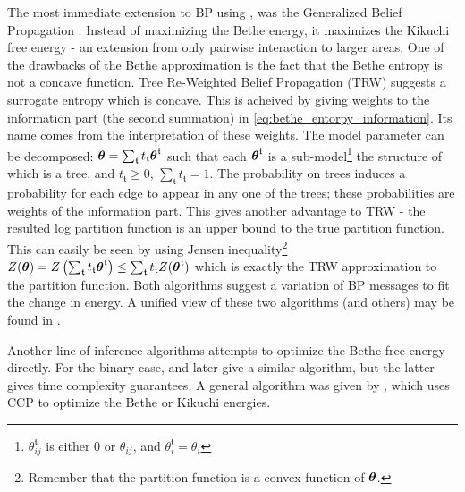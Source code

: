 The most immediate extension to BP using , was the Generalized Belief Propagation \cite{yedidia2000generalized}. 
Instead of maximizing the Bethe energy, it maximizes the Kikuchi free energy - an extension from only pairwise interaction to larger areas.
One of the drawbacks of the Bethe approximation is the fact that the Bethe entropy is not a concave function.
Tree Re-Weighted Belief Propagation (TRW) \cite{wainwright2003tree} suggests a surrogate entropy which is concave.
This is acheived by giving weights to the information part (the second summation) in \eqref{eq:bethe_entorpy_information}.
Its name comes from the interpretation of these weights.
The model parameter can be decomposed: $\boldsymbol{\theta}=\sum_{\mathfrak{t}} t_{\mathfrak{t}}\boldsymbol{\theta}^{\mathfrak{t}}$ such that each $\boldsymbol{\theta}^{\mathfrak{t}}$ is a sub-model\footnote{$\theta^{\mathfrak{t}}_{ij}$ is either $0$ or $\theta_{ij}$, and $\theta^{\mathfrak{t}}_i =\theta_i$} the structure of which is a tree, and $t_{\mathfrak{t}}\geq 0$, $\sum_{\mathfrak{t}} t_{\mathfrak{t}} = 1$.
The probability on trees induces a probability for each edge to appear in any one of the trees;
these probabilities are weights of the information part.
This gives another advantage to TRW - the resulted log partition function is an upper bound to the true partition function. 
This can easily be seen by using Jensen inequality\footnote{Remember that the partition function is a convex function of $\boldsymbol{\theta}$.} $Z(\boldsymbol{\theta}) = Z\left(\sum_{\mathfrak{t}} t_{\mathfrak{t}}\boldsymbol{\theta}^{\mathfrak{t}}\right) \leq \sum_{\mathfrak{t}} t_{\mathfrak{t}} Z(\boldsymbol{\theta}^{\mathfrak{t}})$ which is exactly the TRW approximation to the partition function.
Both algorithms suggest a variation of BP messages to fit the change in energy.
A unified view of these two algorithms (and others) may be found in \cite{meshi2009convexifying}.

Another line of inference algorithms attempts to optimize the Bethe free energy directly.
For the binary case, \cite{welling2001belief} and later \cite{shin2012complexity} give a similar algorithm, but the latter gives time complexity guarantees.
A general algorithm was given by \cite{yuille2002cccp}, which uses CCP\cite{yuille2002concave} to optimize the Bethe or Kikuchi energies.

